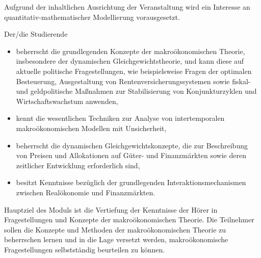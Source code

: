 \begin{module}
\begin{styleenv}
\begin{recommendations}
 

Aufgrund der inhaltlichen Ausrichtung der Veranstaltung wird ein Interesse an quantitativ-mathematischer Modellierung vorausgesetzt.

\end{recommendations}
\end{styleenv}

\begin{learningoutcomes}
Der/die Studierende

 \begin{itemize}\item beherrscht die grundlegenden Konzepte der makroökonomischen Theorie, insbesondere der dynamischen Gleichgewichtstheorie, und kann diese auf aktuelle politische Fragestellungen, wie beispielsweise Fragen der optimalen Besteuerung, Ausgestaltung von Rentenversicherungssystemen sowie fiskal- und geldpolitische Maßnahmen zur Stabilisierung von Konjunkturzyklen und Wirtschaftswachstum anwenden,  \item kennt die wesentlichen Techniken zur Analyse von intertemporalen makroökonomischen Modellen mit Unsicherheit,  \item beherrscht die dynamischen Gleichgewichtskonzepte, die zur Beschreibung von Preisen und Allokationen auf Güter- und Finanzmärkten sowie deren zeitlicher Entwicklung erforderlich sind,  \item besitzt Kenntnisse bezüglich der grundlegenden Interaktionsmechanismen zwischen Realökonomie und Finanzmärkten.  \end{itemize}
\end{learningoutcomes}

\begin{content}
Hauptziel des Moduls ist die Vertiefung der Kenntnisse der Hörer in Fragestellungen und Konzepte der makroökonomischen Theorie. Die Teilnehmer sollen die Konzepte und Methoden der makroökonomischen Theorie zu beherrschen lernen und in die Lage versetzt werden, makroökonomische Fragestellungen selbstständig beurteilen zu können.


\end{content}



\end{module}

